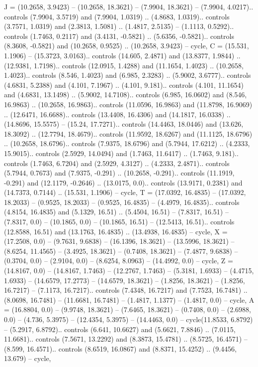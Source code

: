 {J} = {(10.2658, 3.9423) -- (10.2658, 18.3621) -- (7.9904, 18.3621) -- (7.9904, 4.0217).. controls (7.9904, 3.5719) and (7.9904, 1.0319) .. (4.8683, 1.0319).. controls (3.7571, 1.0319) and (2.3813, 1.5081) .. (1.4817, 2.5135) -- (1.1113, 0.5292).. controls (1.7463, 0.2117) and (3.4131, -0.5821) .. (5.6356, -0.5821).. controls (8.3608, -0.5821) and (10.2658, 0.9525) .. (10.2658, 3.9423) -- cycle},
{C} = {(15.531, 1.1906) -- (15.3723, 3.0163).. controls (14.605, 2.4871) and (13.8377, 1.9844) .. (12.9381, 1.7198).. controls (12.0915, 1.4288) and (11.1654, 1.4023) .. (10.2658, 1.4023).. controls (8.546, 1.4023) and (6.985, 2.3283) .. (5.9002, 3.6777).. controls (4.6831, 5.2388) and (4.101, 7.1967) .. (4.101, 9.181).. controls (4.101, 11.1654) and (4.6831, 13.1498) .. (5.9002, 14.7108).. controls (6.985, 16.0602) and (8.546, 16.9863) .. (10.2658, 16.9863).. controls (11.0596, 16.9863) and (11.8798, 16.9069) .. (12.6471, 16.6688).. controls (13.4408, 16.4306) and (14.1817, 16.0338) .. (14.8696, 15.5575) -- (15.24, 17.7271).. controls (14.4463, 18.0446) and (13.626, 18.3092) .. (12.7794, 18.4679).. controls (11.9592, 18.6267) and (11.1125, 18.6796) .. (10.2658, 18.6796).. controls (7.9375, 18.6796) and (5.7944, 17.6212) .. (4.2333, 15.9015).. controls (2.5929, 14.0494) and (1.7463, 11.6417) .. (1.7463, 9.181).. controls (1.7463, 6.7204) and (2.5929, 4.3127) .. (4.2333, 2.4871).. controls (5.7944, 0.7673) and (7.9375, -0.291) .. (10.2658, -0.291).. controls (11.1919, -0.291) and (12.1179, -0.2646) .. (13.0175, 0.0).. controls (13.9171, 0.2381) and (14.7373, 0.7144) .. (15.531, 1.1906) -- cycle},
{T} = {(17.0392, 16.4835) -- (17.0392, 18.2033) -- (0.9525, 18.2033) -- (0.9525, 16.4835) -- (4.4979, 16.4835).. controls (4.8154, 16.4835) and (5.1329, 16.51) .. (5.4504, 16.51) -- (7.8317, 16.51) -- (7.8317, 0.0) -- (10.1865, 0.0) -- (10.1865, 16.51) -- (12.5413, 16.51).. controls (12.8588, 16.51) and (13.1763, 16.4835) .. (13.4938, 16.4835) -- cycle},
{X} = {(17.2508, 0.0) -- (9.7631, 9.6838) -- (16.1396, 18.3621) -- (13.5996, 18.3621) -- (8.6254, 11.4565) -- (3.4925, 18.3621) -- (0.7408, 18.3621) -- (7.4877, 9.6838) -- (0.3704, 0.0) -- (2.9104, 0.0) -- (8.6254, 8.0963) -- (14.4992, 0.0) -- cycle},
{Z} = {(14.8167, 0.0) -- (14.8167, 1.7463) -- (12.2767, 1.7463) -- (5.3181, 1.6933) -- (4.4715, 1.6933) -- (14.6579, 17.2773) -- (14.6579, 18.3621) -- (1.8256, 18.3621) -- (1.8256, 16.7217) -- (7.1173, 16.7217).. controls (7.4348, 16.7217) and (7.7523, 16.7481) .. (8.0698, 16.7481) -- (11.6681, 16.7481) -- (1.4817, 1.1377) -- (1.4817, 0.0) -- cycle},
{A} = {(16.8804, 0.0) -- (9.9748, 18.3621) -- (7.6465, 18.3621) -- (0.7408, 0.0) -- (2.6988, 0.0) -- (4.736, 5.3975) -- (12.4354, 5.3975) -- (14.4463, 0.0) -- cycle(11.8533, 6.8792) -- (5.2917, 6.8792).. controls (6.641, 10.6627) and (5.6621, 7.8846) .. (7.0115, 11.6681).. controls (7.5671, 13.2292) and (8.3873, 15.4781) .. (8.5725, 16.4571) -- (8.599, 16.4571).. controls (8.6519, 16.0867) and (8.8371, 15.4252) .. (9.4456, 13.679) -- cycle},
